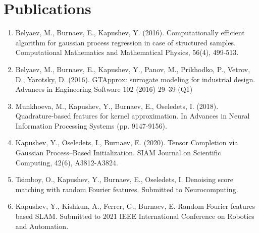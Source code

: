 \chapter{Publications}
\label{chap:publications}

\begin{enumerate}
    \item Belyaev, M., Burnaev, E., Kapushev, Y. (2016). Computationally efficient algorithm
    for gaussian process regression in case of structured samples. Computational Mathematics
    and Mathematical Physics, 56(4), 499-513.
    \item Belyaev, M., Burnaev, E., Kapushev, Y., Panov, M., Prikhodko, P., Vetrov, D., Yarotsky, D. (2016).
    GTApprox: surrogate modeling for industrial design. Advances in Engineering Software 102 (2016) 29–39 (Q1)
    \item Munkhoeva, M., Kapushev, Y., Burnaev, E., Oseledets, I. (2018). Quadrature-based
    features for kernel approximation. In Advances in Neural Information Processing Systems
    (pp. 9147-9156).
    \item Kapushev, Y., Oseledets, I.,  Burnaev, E. (2020). Tensor Completion via Gaussian Process--Based Initialization. SIAM Journal on Scientific Computing, 42(6), A3812-A3824.
    \item Tsimboy, O., Kapushev, Y., Burnaev, E., Oseledets, I. Denoising score matching with random Fourier features. Submitted to Neurocomputing.
    \item Kapushev, Y., Kishkun, A., Ferrer, G., Burnaev, E. Random  Fourier  features  based  SLAM. Submitted to 2021 IEEE International Conference on Robotics and Automation.
\end{enumerate}
